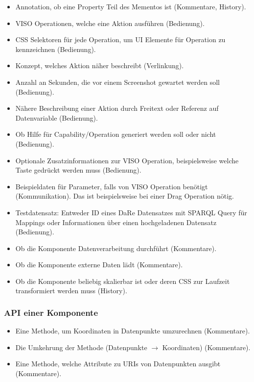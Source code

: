 \documentclass[
	headsepline,
	footsepline,
	fontsize=12pt,
	bibliography=totoc
]{scrbook}
\begin{document}
\begin{itemize}
	\item Annotation, ob eine Property Teil des Mementos ist (Kommentare, History).
	\item VISO Operationen, welche eine Aktion ausführen (Bedienung).
	\item CSS Selektoren für jede Operation, um UI Elemente für Operation zu kennzeichnen (Bedienung).
	\item Konzept, welches Aktion näher beschreibt (Verlinkung).
	\item Anzahl an Sekunden, die vor einem Screenshot gewartet werden soll (Bedienung).
	\item Nähere Beschreibung einer Aktion durch Freitext oder Referenz auf Datenvariable (Bedienung).
	\item Ob Hilfe für Capability/Operation generiert werden soll oder nicht (Bedienung).
	\item Optionale Zusatzinformationen zur VISO Operation, beispielsweise welche Taste gedrückt werden muss (Bedienung).
	\item Beispieldaten für Parameter, falls von VISO Operation benötigt (Kommunikation). Das ist beispielsweise bei einer Drag Operation nötig.
	\item Testdatensatz: Entweder ID eines DaRe Datensatzes mit SPARQL Query für Mappings oder Informationen über einen hochgeladenen Datensatz (Bedienung).
	\item Ob die Komponente Datenverarbeitung durchführt (Kommentare).
	\item Ob die Komponente externe Daten lädt (Kommentare).
	\item Ob die Komponente beliebig skalierbar ist oder deren CSS zur Laufzeit transformiert werden muss (History).
\end{itemize}

\subsubsection{API einer Komponente}

\begin{itemize}
	\item Eine Methode, um Koordinaten in Datenpunkte umzurechnen (Kommentare).
	\item Die Umkehrung der Methode (Datenpunkte $\to$ Koordinaten) (Kommentare).
	\item Eine Methode, welche Attribute zu URIs von Datenpunkten ausgibt (Kommentare).
\end{itemize}
\end{document}
